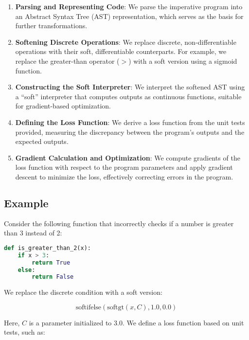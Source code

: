 \documentclass{article}
\begin{document}
\begin{enumerate}
    \item \textbf{Parsing and Representing Code}: We parse the imperative program into an Abstract Syntax Tree (AST) representation, which serves as the basis for further transformations.

    \item \textbf{Softening Discrete Operations}: We replace discrete, non-differentiable operations with their soft, differentiable counterparts. For example, we replace the greater-than operator ($>$) with a soft version using a sigmoid function.

    \item \textbf{Constructing the Soft Interpreter}: We interpret the softened AST using a ``soft'' interpreter that computes outputs as continuous functions, suitable for gradient-based optimization.

    \item \textbf{Defining the Loss Function}: We derive a loss function from the unit tests provided, measuring the discrepancy between the program's outputs and the expected outputs.

    \item \textbf{Gradient Calculation and Optimization}: We compute gradients of the loss function with respect to the program parameters and apply gradient descent to minimize the loss, effectively correcting errors in the program.

\end{enumerate}

\subsection{Example}

Consider the following function that incorrectly checks if a number is greater than 3 instead of 2:

\begin{lstlisting}[language=Python]
def is_greater_than_2(x):
    if x > 3:
        return True
    else:
        return False
\end{lstlisting}

We replace the discrete condition with a soft version:

\begin{equation}
\text{softifelse}(\text{softgt}(x, C), 1.0, 0.0)
\end{equation}

Here, $C$ is a parameter initialized to 3.0. We define a loss function based on unit tests, such as:
\end{document}
